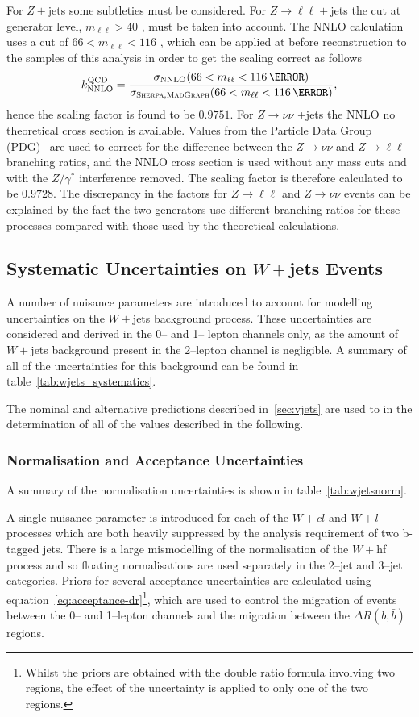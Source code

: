 For $Z+$jets some subtleties must be considered. For $Z\to\ell\ell +$jets the
cut at generator level, $m_{\ell\ell}>40$ \GeV, must be taken into account. The
NNLO calculation uses a cut of $66<m_{\ell\ell}<116$ \GeV, which can be applied
at before reconstruction to the samples of this analysis in order to get the
scaling correct as follows
\begin{equation}
  k_{\text{NNLO}}^{\text{QCD}} =
  \frac{\sigma_{\text{NNLO}}(66<m_{\ell\ell}<116\,{\GeV})}%
  {\sigma_{\textsc{Sherpa},\textsc{MadGraph}}(66<m_{\ell\ell}<116\,{\GeV})},
  \label{eq:nnlo-vjets-k}
\end{equation}
hence the scaling factor is found to be $0.9751$. For $Z \to \nu\nu$ +jets the
NNLO no theoretical cross section is available. Values from the
Particle Data Group (PDG)~\cite{PDG} are used to correct for the difference
between the $Z \to \nu\nu$ and $Z \to \ell\ell$ branching ratios, and the NNLO
cross section is used without any mass cuts and with the $Z/\gamma^*$
interference removed. The scaling factor is therefore calculated to be $0.9728$.
The discrepancy in the factors for $Z\to\ell\ell$ and $Z\to\nu\nu$ events can be
explained by the fact the two generators use different branching ratios for
these processes compared with those used by the theoretical calculations.

\subsection{Systematic Uncertainties on $W+$jets Events}
A number of nuisance parameters are introduced to account for modelling
uncertainties on the $W+$jets background process. These uncertainties are
considered and derived in the 0-- and 1-- lepton channels only, as the amount of
$W+$jets background present in the 2--lepton channel is negligible. A summary of
all of the uncertainties for this background can be found in
table~\ref{tab:wjets_systematics}.

The nominal and alternative predictions described in~\ref{sec:vjets} are used to
in the determination of all of the values described in the following. 

\subsubsection{Normalisation and Acceptance Uncertainties}
A summary of the normalisation uncertainties is shown in
table~\ref{tab:wjetsnorm}.

A single nuisance parameter is introduced for each of the $W+cl$ and $W+l$
processes which are both heavily suppressed by the analysis requirement of two
b-tagged jets. There is a large mismodelling of the normalisation of the $W+$hf
process and so floating normalisations are used separately in the 2--jet and
3--jet categories. Priors for several acceptance uncertainties are calculated using
equation~\ref{eq:acceptance-dr}\footnote{Whilst the priors are obtained with the
  double ratio formula involving two regions, the effect of the uncertainty is
  applied to only one of the two regions.}, which are used to
control the migration of events between the 0-- and 1--lepton channels and the
migration between the $\Delta R(b, \bar{b})$ regions.

